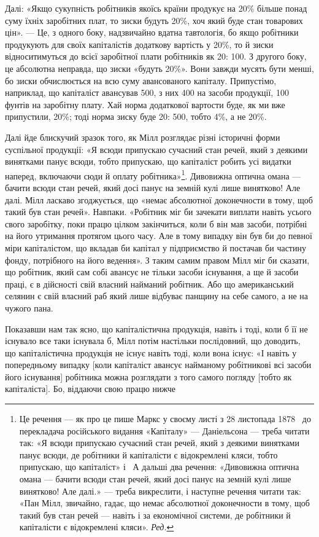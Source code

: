 \parcont{}  %
Далі: «Якщо сукупність робітників якоїсь країни продукує
на 20\% більше понад суму їхніх заробітних плат, то зиски будуть
20\%, хоч який буде стан товарових цін». — Це, з одного
боку, надзвичайно вдатна тавтологія, бо якщо робітники продукують
для своїх капіталістів додаткову вартість у 20\%, то й зиски
відноситимуться до всієї заробітної плати робітників як 20: 100.
З другого боку, це абсолютна неправда, що зиски «будуть 20\%».
Вони завжди мусять бути менші, бо зиски обчислюється на всю
суму авансованого капіталу. Припустімо, наприклад, що капіталіст
авансував 500, з них 400
на засоби продукції, 100 фунтів на заробітну плату. Хай
норма додаткової вартости буде, як ми вже припустили, 20\%;
тоді норма зиску буде 20: 500, тобто 4\%, а не 20\%.

Далі йде блискучий зразок того, як Мілл розглядає різні
історичні форми суспільної продукції: «Я всюди припускаю
сучасний стан речей, який з деякими винятками панує всюди,
тобто припускаю, що капіталіст робить усі видатки наперед,
включаючи сюди й оплату робітника»\footnote*{
Це речення — як про це пише Маркс у своєму листі з 28 листопада
1878~ до перекладача російського видання «Капіталу» — Даніельсона —
треба читати так: «Я всюди припускаю сучасний стан речей, який з деякими
винятками панує всюди, де робітники й капіталісти є відокремлені
кляси, тобто припускаю, що капіталіст» і~ А дальші два речення:
«Дивовижна оптична омана — бачити всюди стан речей, який досі
панує на земній кулі лише винятково! Але далі.» — треба викреслити, і
наступне речення читати так: «Пан Мілл, звичайно, гадає, що немає
абсолютної доконечности в тому, щоб такий був стан речей — навіть
і за економічної системи, де робітники й капіталісти є відокремлені
кляси». \emph{Ред.}
}. Дивовижна оптична
омана — бачити всюди стан речей, який досі панує на земній
кулі лише винятково! Але далі. Мілл ласкаво згоджується, що
«немає абсолютної доконечности в тому, щоб такий був стан
речей». Навпаки. «Робітник міг би зачекати виплати навіть
усього свого заробітку, поки працю цілком закінчиться, коли б
він мав засоби, потрібні на його утримання протягом цього часу.
Але в тому випадку він був би до певної міри капіталістом, що
вкладав би капітал у підприємство й постачав би частину фонду,
потрібного на його ведення». З таким самим правом Мілл міг би
сказати, що робітник, який сам собі авансує не тільки засоби
існування, а ще й засоби праці, є в дійсності свій власний найманий
робітник. Або що американський селянин є свій власний
раб який лише відбуває панщину на себе самого, а не на чужого
пана.

Показавши нам так ясно, що капіталістична продукція, навіть
і тоді, коли б її не існувало все таки існувала б, Мілл потім
настільки послідовний, що доводить, що капіталістична продукція
не існує навіть тоді, коли вона існує: «І навіть у попередньому
випадку [коли капіталіст авансує найманому робітникові всі
засоби його існування] робітника можна розглядати з того самого
погляду [тобто як капіталіста]. Бо, віддаючи свою працю нижче
\parbreak{}  %
